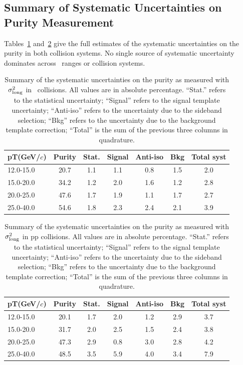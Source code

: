 \FloatBarrier
\subsection{Summary of Systematic Uncertainties on Purity Measurement}

Tables~\ref{tab:pursystppblambda} and~\ref{tab:pursystpplambda} give the full estimates of the systematic uncertainties on the purity in both collision systems. No single source of systematic uncertainty dominates across \pt~ranges or collision systems.


\begin{table}[htpb]
    \centering
        \caption{Summary of the systematic uncertainties on the purity as measured with $\sigma^{2}_{\mathrm{long}}$ in \pPb~collisions. All values are in absolute percentage. ``Stat.'' refers to the statistical uncertainty; ``Signal'' refers to the signal template uncertainty; ``Anti-iso'' refers to the uncertainty due to the sideband selection; ``Bkg'' refers to the uncertainty due to the background template correction; ``Total'' is the sum of the previous three columns in quadrature.}
    \begin{tabular*}{1.0\columnwidth}{@{\extracolsep{\fill}}lcccccc@{}}
    \hline
    	pT(GeV/$c$) & Purity & Stat. & Signal & Anti-iso & Bkg & Total syst \\ \hline
    	12.0-15.0 & 20.7 & 1.1 & 1.1 & 0.8 & 1.5 & 2.0 \\
    	15.0-20.0 & 34.2 & 1.2 & 2.0 & 1.6 & 1.2 & 2.8 \\
    	20.0-25.0 & 47.6 & 1.7 & 1.9 & 1.1 & 1.7 & 2.7 \\
    	25.0-40.0 & 54.6 & 1.8 & 2.3 & 2.4 & 2.1 & 3.9 \\
    \end{tabular*}
    \label{tab:pursystppblambda}
\end{table}


\begin{table}[htpb]
    \centering
        \caption{Summary of the systematic uncertainties on the purity as measured with $\sigma^{2}_{\mathrm{long}}$ in pp collisions. All values are in absolute percentage. ``Stat.'' refers to the statistical uncertainty; ``Signal'' refers to the signal template uncertainty; ``Anti-iso'' refers to the uncertainty due to the sideband selection; ``Bkg'' refers to the uncertainty due to the background template correction; ``Total'' is the sum of the previous three columns in quadrature.}
    \begin{tabular*}{1.0\columnwidth}{@{\extracolsep{\fill}}lcccccc@{}}
    \hline
    	pT(GeV/$c$) & Purity & Stat. & Signal & Anti-iso & Bkg & Total syst \\ \hline
    	12.0-15.0 & 20.1 & 1.7 & 2.0 & 1.2 & 2.9 & 3.7 \\
    	15.0-20.0 & 31.7 & 2.0 & 2.5 & 1.5 & 2.4 & 3.8 \\
    	20.0-25.0 & 47.3 & 2.9 & 0.8 & 3.0 & 2.8 & 4.2 \\
    	25.0-40.0 & 48.5 & 3.5 & 5.9 & 4.0 & 3.4 & 7.9 \\
    \end{tabular*}
    \label{tab:pursystpplambda}
\end{table}



